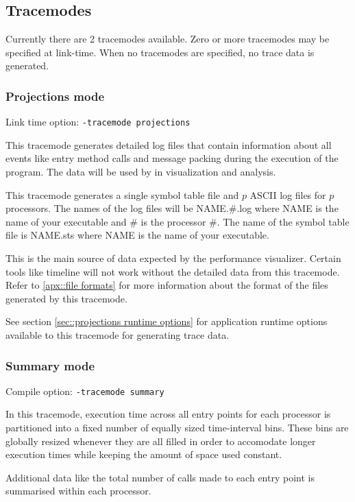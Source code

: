 \documentclass[10pt,dvips]{article}
\begin{document}
\subsection{Tracemodes}
\label{sec::trace modules}

Currently there are 2 tracemodes available. Zero or more tracemodes
may be specified at link-time. When no tracemodes are specified, no
trace data is generated.

\subsubsection{Projections mode}

Link time option: {\tt -tracemode projections}

This tracemode generates detailed log files that contain information
about all \charmpp{} events like entry method calls and message
packing during the execution of the program.  The data will be used by
\projections{} in visualization and analysis.

This tracemode generates a single symbol table file and $p$ ASCII log
files for $p$ processors. The names of the log files will be
NAME.\#.log where NAME is the name of your executable and \# is the
processor \#. The name of the symbol table file is NAME.sts where NAME
is the name of your executable.

This is the main source of data expected by the performance
visualizer. Certain tools like timeline will not work without the
detailed data from this tracemode. Refer to \ref{apx::file
formats} for more information about the format of the files generated
by this tracemode.

See section \ref{sec::projections runtime options} for application runtime
options available to this tracemode for generating trace data.

\subsubsection{Summary mode}

Compile option: {\tt -tracemode summary}

In this tracemode, execution time across all entry points for each
processor is partitioned into a fixed number of equally sized
time-interval bins. These bins are globally resized whenever they are
all filled in order to accomodate longer execution times while keeping
the amount of space used constant.

Additional data like the total number of calls made to each entry
point is summarised within each processor.
\end{document}
